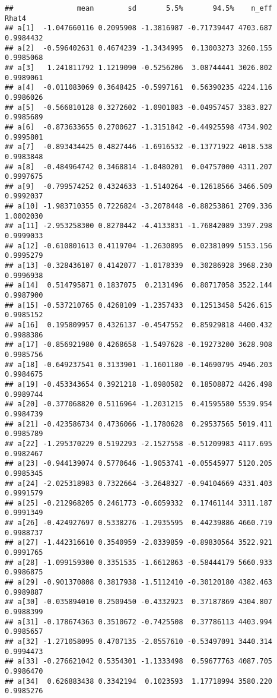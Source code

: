 \documentclass[
]{article}
\begin{document}
\begin{verbatim}
##               mean        sd       5.5%       94.5%    n_eff     Rhat4
## a[1]  -1.047660116 0.2095908 -1.3816987 -0.71739447 4703.687 0.9984432
## a[2]  -0.596402631 0.4674239 -1.3434995  0.13003273 3260.155 0.9985068
## a[3]   1.241811792 1.1219090 -0.5256206  3.08744441 3026.802 0.9989061
## a[4]  -0.011083069 0.3648425 -0.5997161  0.56390235 4224.116 0.9986026
## a[5]  -0.566810128 0.3272602 -1.0901083 -0.04957457 3383.827 0.9985689
## a[6]  -0.873633655 0.2700627 -1.3151842 -0.44925598 4734.902 0.9995801
## a[7]  -0.893434425 0.4827446 -1.6916532 -0.13771922 4018.538 0.9983848
## a[8]  -0.484964742 0.3468814 -1.0480201  0.04757000 4311.207 0.9997675
## a[9]  -0.799574252 0.4324633 -1.5140264 -0.12618566 3466.509 0.9992037
## a[10] -1.983710355 0.7226824 -3.2078448 -0.88253861 2709.336 1.0002030
## a[11] -2.953258300 0.8270442 -4.4133831 -1.76842089 3397.298 0.9999033
## a[12] -0.610801613 0.4119704 -1.2630895  0.02381099 5153.156 0.9995279
## a[13] -0.328436107 0.4142077 -1.0178339  0.30286928 3968.230 0.9996938
## a[14]  0.514795871 0.1837075  0.2131496  0.80717058 3522.144 0.9987900
## a[15] -0.537210765 0.4268109 -1.2357433  0.12513458 5426.615 0.9985152
## a[16]  0.195809957 0.4326137 -0.4547552  0.85929818 4400.432 0.9988386
## a[17] -0.856921980 0.4268658 -1.5497628 -0.19273200 3628.908 0.9985756
## a[18] -0.649237541 0.3133901 -1.1601180 -0.14690795 4946.203 0.9984675
## a[19] -0.453343654 0.3921218 -1.0980582  0.18508872 4426.498 0.9989744
## a[20] -0.377068820 0.5116964 -1.2031215  0.41595580 5539.954 0.9984739
## a[21] -0.423586734 0.4736066 -1.1780628  0.29537565 5019.411 0.9985789
## a[22] -1.295370229 0.5192293 -2.1527558 -0.51209983 4117.695 0.9982467
## a[23] -0.944139074 0.5770646 -1.9053741 -0.05545977 5120.205 0.9985345
## a[24] -2.025318983 0.7322664 -3.2648327 -0.94104669 4331.403 0.9991579
## a[25] -0.212968205 0.2461773 -0.6059332  0.17461144 3311.187 0.9991349
## a[26] -0.424927697 0.5338276 -1.2935595  0.44239886 4660.719 0.9988737
## a[27] -1.442316610 0.3540959 -2.0339859 -0.89830564 3522.921 0.9991765
## a[28] -1.099159300 0.3351535 -1.6612863 -0.58444179 5660.933 0.9986875
## a[29] -0.901370808 0.3817938 -1.5112410 -0.30120180 4382.463 0.9989887
## a[30] -0.035894010 0.2509450 -0.4332923  0.37187869 4304.807 0.9988399
## a[31] -0.178674363 0.3510672 -0.7425508  0.37786113 4403.994 0.9985657
## a[32] -1.271058095 0.4707135 -2.0557610 -0.53497091 3440.314 0.9994473
## a[33] -0.276621042 0.5354301 -1.1333498  0.59677763 4087.705 0.9986470
## a[34]  0.626883438 0.3342194  0.1023593  1.17718994 3580.220 0.9985276

\end{verbatim}
\end{document}
